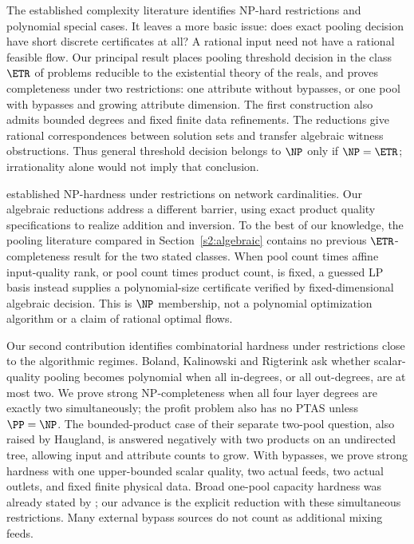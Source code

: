 The established complexity literature identifies NP-hard restrictions
and polynomial special cases. It leaves a more basic issue: does exact
pooling decision have short discrete certificates at all? A rational
input need not have a rational feasible flow. Our principal result places
pooling threshold decision in the class $\ETR$ of problems reducible to
the existential theory of the reals, and proves completeness under two
restrictions: one attribute without bypasses, or one pool with bypasses
and growing attribute dimension. The first construction also admits
bounded degrees and fixed finite data refinements. The reductions give
rational correspondences between solution sets and transfer algebraic
witness obstructions. Thus general threshold decision belongs to $\NP$
only if $\NP=\ETR$; irrationality alone would not imply that conclusion.

\citet{haugland2016-the-computational-complexity-of-the} established
NP-hardness under restrictions on network cardinalities. Our algebraic
reductions address a different barrier, using exact product quality
specifications to realize addition and inversion. To the best of our
knowledge, the pooling literature compared in Section~\ref{s2:algebraic}
contains no previous $\ETR$-completeness result for the two stated
classes. When pool count times affine input-quality rank, or pool count
times product count, is fixed, a guessed LP basis instead supplies a
polynomial-size certificate verified by fixed-dimensional algebraic
decision. This is $\NP$ membership, not a polynomial optimization
algorithm or a claim of rational optimal flows.

Our second contribution identifies combinatorial hardness under
restrictions close to the algorithmic regimes. Boland, Kalinowski and
Rigterink \cite[author manuscript, Section~4]{s4:boland2017} ask whether
scalar-quality pooling becomes polynomial when all in-degrees, or all
out-degrees, are at most two. We prove strong NP-completeness when all
four layer degrees are exactly two simultaneously; the profit problem
also has no PTAS unless $\PP=\NP$. The bounded-product case of their
separate two-pool question, also raised by Haugland, is answered negatively
with two products on an undirected tree, allowing input and attribute counts to
grow. With bypasses, we prove strong hardness with one upper-bounded
scalar quality, two actual feeds, two actual outlets, and fixed finite
physical data. Broad one-pool capacity hardness was already stated by
\citet[Remark~4.6]{s3:baltean2018}; our advance is the explicit reduction
with these simultaneous restrictions. Many external bypass sources do
not count as additional mixing feeds.

